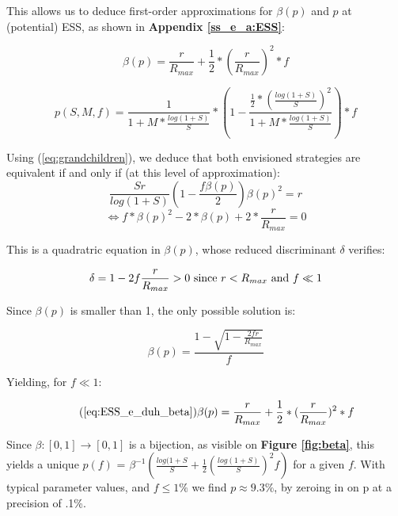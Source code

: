 
     
This allows us to deduce first-order approximations for $\beta(p)$ and $p$ at (potential) ESS, as shown in
\textbf{Appendix \ref{ss_e_a:ESS}}:

\begin{equation}
    \label{eq:ESS_e_duh_beta}
    \beta(p) = \frac{r}{R_{max}}+\frac{1}{2}*(\frac{r}{R_{max}})^2*f
\end{equation}

 \begin{equation}
    \label{eq:approx_p_exo}
    p(S,M,f) = \frac{1}{1+M*\frac{log(1+S)}{S}}*
    (1- \frac{\frac{1}{2}*
    (\frac{log(1+S)}{S})^2}{1+M*\frac{log(1+S)}{S}})*f
    \end{equation}





Using (\ref{eq:grandchildren}), we deduce that both envisioned strategies are equivalent if
and only if (at this level of approximation):
\[\frac{Sr}{log(1+S)}(1-\frac{f\beta(p)}{2})\beta(p)^2=r  \]
\begin{equation}
    \label{eq:trinome_beta}
    \iff f*\beta(p)^2 - 2*\beta(p) + 2*\frac{r}{R_{max}} = 0
\end{equation}

This is a quadratric equation in $\beta(p)$, whose reduced discriminant $\delta$ verifies:

\[\delta = 1 - 2f\frac{r}{R_{max}} > 0 \textnormal{ since } 
r<R_{max} \textnormal{ and } f \ll 1 
\]

Since $\beta(p)$ is smaller than 1, the
only possible solution is:

\[\beta(p) = \frac{1 - \sqrt{1-\frac{2fr}{R_{max}}}}{f} \]

Yielding, for $f \ll 1$:

\begin{equation}\tag{\ref{eq:ESS_e_duh_beta}}
    \beta(p) = \frac{r}{R_{max}}+\frac{1}{2}*(\frac{r}{R_{max}})^2*f
\end{equation}


Since $\beta \colon [0,1] \to [0,1]$ is a bijection, as visible on
 \textbf{Figure \ref{fig:beta}}, 
 this yields a unique $p(f)$ = $\beta^{-1}(\frac{log(1+S}{S} + \frac{1}{2}(\frac{log(1+S)}{S})^2f)$
 for a given $f$. With typical parameter values, and $f\leq 1\%$
 we find $p \approx 9.3\%$, by zeroing in on p at a precision of .1\%.

